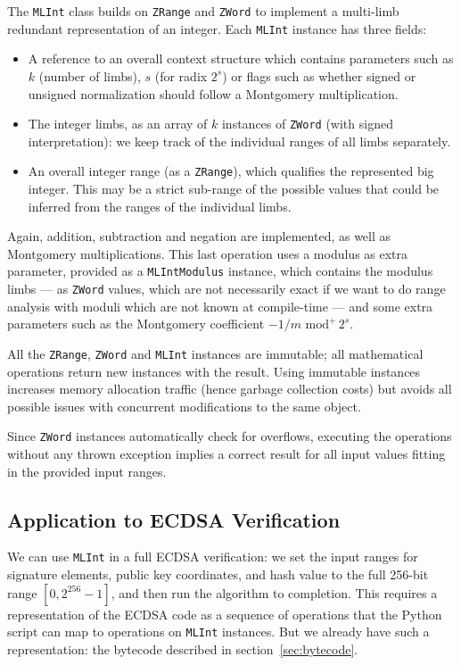 \documentclass{llncs}
\newcommand{\umod}[2]{#1 \,\,\text{mod}^{+}\, #2}
\begin{document}
The \verb+MLInt+ class builds on \verb+ZRange+ and \verb+ZWord+ to
implement a multi-limb redundant representation of an integer. Each
\verb+MLInt+ instance has three fields:
\begin{itemize}

    \item A reference to an overall context structure which contains
    parameters such as $k$ (number of limbs), $s$ (for radix $2^s$)
    or flags such as whether signed or unsigned normalization should
    follow a Montgomery multiplication.

    \item The integer limbs, as an array of $k$ instances of
    \verb+ZWord+ (with signed interpretation): we keep track of the
    individual ranges of all limbs separately.

    \item An overall integer range (as a \verb+ZRange+), which qualifies
    the represented big integer. This may be a strict sub-range of
    the possible values that could be inferred from the ranges of
    the individual limbs.

\end{itemize}
Again, addition, subtraction and negation are implemented, as well
as Montgomery multiplications. This last operation uses a modulus
as extra parameter, provided as a \verb+MLIntModulus+ instance, which
contains the modulus limbs --- as \verb+ZWord+ values, which are not
necessarily exact if we want to do range analysis with moduli which
are not known at compile-time --- and some extra parameters such as
the Montgomery coefficient $\umod{-1/m}{2^s}$.

All the \verb+ZRange+, \verb+ZWord+ and \verb+MLInt+ instances are
immutable; all mathematical operations return new instances with the
result. Using immutable instances increases memory allocation traffic
(hence garbage collection costs) but avoids all possible issues with
concurrent modifications to the same object.

Since \verb+ZWord+ instances automatically check for overflows, executing
the operations without any thrown exception implies a correct result
for all input values fitting in the provided input ranges.

\subsection{Application to ECDSA Verification}

We can use \verb+MLInt+ in a full ECDSA verification: we set the input
ranges for signature elements, public key coordinates, and hash value
to the full 256-bit range $[0, 2^{256} - 1]$, and then run the algorithm
to completion. This requires a representation of the ECDSA code as
a sequence of operations that the Python script can map to operations
on \verb+MLInt+ instances. But we already have such a representation:
the bytecode described in section~\ref{sec:bytecode}.
\end{document}
